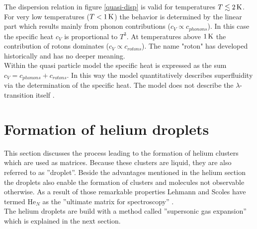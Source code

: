 \documentclass[parskip,12pt,headsepline,a4paper] {scrbook}
\begin{document}
The dispersion relation in figure \ref{quasi-disp} is valid for temperatures $T \lesssim \unit[2]{K}$. For very low temperatures ($T < \unit[1]{K}$) the behavior is determined by the linear part which results mainly from phonon contributions ($c_V \propto c_{phonons}$). In this case the specific heat $c_V$ is proportional to $T^3$. At temperatures above $\unit[1]{K}$ the contribution of rotons dominates ($c_V \propto c_{rotons}$). The name "roton" has developed historically and has no deeper meaning. \\
Within the quasi particle model the specific heat is expressed as the sum $c_V = c_{phonons} + c_{rotons}$. In this way the model quantitatively describes superfluidity via the determination of the specific heat. The model does not describe the $\lambda$-transition itself \cite{fliessbach}.


\section{Formation of helium droplets}
\vspace{-1\baselineskip}
This section discusses the process leading to the formation of helium clusters which are used as matrices. Because these clusters are liquid, they are also referred to as ''droplet''. Beside the advantages mentioned in the helium section the droplets also enable the formation of clusters and molecules not observable otherwise. As a result of those remarkable properties Lehmann and Scoles have termed He$_N$ as the ''ultimate matrix for spectroscopy'' \cite{ultimate}. \\
The helium droplets are build with a method called ''supersonic gas expansion'' which is explained in the next section.

\end{document}
